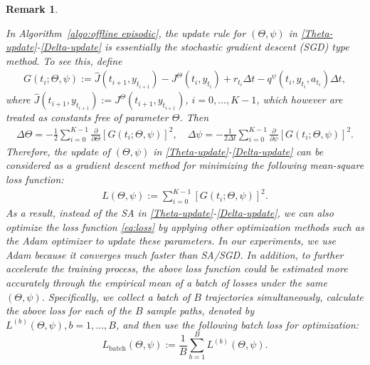 \documentclass[11pt]{article}
\newtheorem{remark}{Remark}
\begin{document}
\begin{remark}\label{adam}

In Algorithm~\ref{algo:offline episodic}, the update rule for $(\Theta, \psi)$ in \eqref{Theta-update}-\eqref{Delta-update} is essentially  the stochastic gradient descent (SGD) type method. To see this, define
	\begin{align*}
		 G(t_i; \Theta, \psi) := \hat J(t_{i+1},y_{t_{i+1}}) - J^{\Theta}(t_{i}, y_{t_{i}}) + r_{t_i}\Delta t - q^{\psi}(t_{i},y_{t_{i}},a_{t_i})\Delta t,
	\end{align*}
	where $\hat J(t_{i+1},y_{t_{i+1}}) := J^\Theta(t_{i+1},y_{t_{i+1}})$,  $i=0, ..., K - 1$, which however are treated  as constants free of parameter $\Theta$. Then
	\begin{align*}
		\Delta \Theta = - \frac{1}{2}\sum_{i=0}^{K - 1} \frac{\partial}{\partial\Theta}\left[ G(t_i; \Theta, \psi)\right]^2, \quad \Delta \psi = - \frac{1}{2\Delta t}\sum_{i=0}^{K - 1} \frac{\partial}{\partial\psi}\left[ G(t_i; \Theta, \psi)\right]^2.
	\end{align*}
	Therefore, the update of $(\Theta, \psi)$ in \eqref{Theta-update}-\eqref{Delta-update} can be considered as a gradient descent method for minimizing the following mean-square loss function:
	\begin{align}\label{eq:loss}
		L(\Theta, \psi) := \sum_{i=0}^{K - 1} \left[ G(t_i; \Theta, \psi)\right]^2.
	\end{align}
As a result, instead of the SA in \eqref{Theta-update}-\eqref{Delta-update}, we can also optimize the loss function \eqref{eq:loss} by applying other optimization methods such as the Adam optimizer \citep{kingma2014adam} to update these parameters. In our experiments, we use Adam because it converges much faster than SA/SGD. In addition, to further accelerate the training process, the above loss function could be estimated more accurately through the empirical mean of a batch of losses under the same $(\Theta, \psi)$. Specifically, we collect a batch of $B$ trajectories simultaneously, calculate the above loss for each of the $B$ sample paths, denoted by $L^{(b)}(\Theta, \psi), b=1,..., B$, and then use the following batch loss for optimization:
\begin{equation*}
    L_{\text{batch}}(\Theta, \psi):= \frac{1}{B}\sum_{b=1}^BL^{(b)}(\Theta, \psi).
\end{equation*}
\end{remark}
\end{document}
